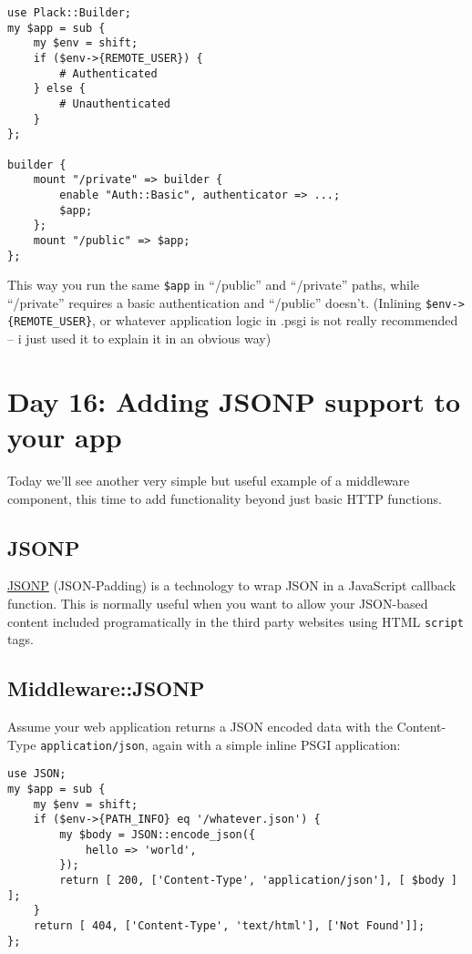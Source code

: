 \begin{lstlisting}
use Plack::Builder;
my $app = sub {
    my $env = shift;
    if ($env->{REMOTE_USER}) { 
        # Authenticated
    } else {
        # Unauthenticated
    }
};

builder {
    mount "/private" => builder {
        enable "Auth::Basic", authenticator => ...;
        $app;
    };
    mount "/public" => $app;
};
\end{lstlisting}

This way you run the same \lstinline!$app! in ``/public'' and
``/private'' paths, while ``/private'' requires a basic authentication
and ``/public'' doesn't. (Inlining \lstinline!$env->{REMOTE_USER}!, or
whatever application logic in .psgi is not really recommended -- i just
used it to explain it in an obvious way)

\chapter{Day 16: Adding JSONP support to your
app}\label{day-16-adding-jsonp-support-to-your-app}

Today we'll see another very simple but useful example of a middleware
component, this time to add functionality beyond just basic HTTP
functions.

\section{JSONP}\label{jsonp}

\href{http://ajaxian.com/archives/jsonp-json-with-padding}{JSONP}
(JSON-Padding) is a technology to wrap JSON in a JavaScript callback
function. This is normally useful when you want to allow your JSON-based
content included programatically in the third party websites using HTML
\lstinline!script! tags.

\section{Middleware::JSONP}\label{middlewarejsonp}

Assume your web application returns a JSON encoded data with the
Content-Type \lstinline!application/json!, again with a simple inline
PSGI application:

\begin{lstlisting}
use JSON;
my $app = sub {
    my $env = shift;
    if ($env->{PATH_INFO} eq '/whatever.json') {
        my $body = JSON::encode_json({
            hello => 'world',
        });
        return [ 200, ['Content-Type', 'application/json'], [ $body ] ];
    }
    return [ 404, ['Content-Type', 'text/html'], ['Not Found']];
};
\end{lstlisting}

